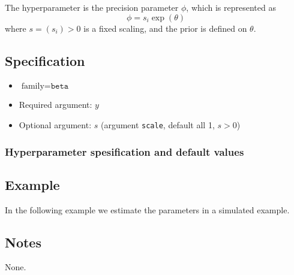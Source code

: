 \documentclass[a4paper,11pt]{article}
\begin{document}
The hyperparameter is the precision parameter $\phi$, which is
represented as
\begin{displaymath}
    \phi = s_i \exp(\theta)
\end{displaymath}
where $s = (s_i) > 0$ is a fixed scaling, and the prior is defined on
$\theta$.

\subsection*{Specification}

\begin{itemize}
\item $\text{family}=\texttt{beta}$
\item Required argument: $y$
\item Optional argument: $s$ (argument \texttt{scale}, default all 1, $s>0$)
\end{itemize}

\subsubsection*{Hyperparameter spesification and default values}



\subsection*{Example}

In the following example we estimate the parameters in a simulated
example.


\subsection*{Notes}

None.
\end{document}
